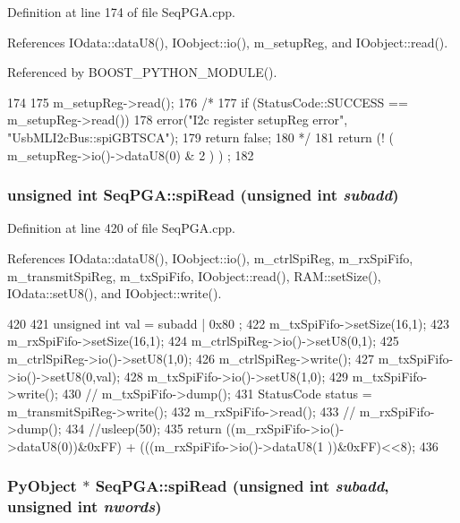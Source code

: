 Definition at line 174 of file SeqPGA.cpp.

References IOdata::dataU8(), IOobject::io(), m\_\-setupReg, and IOobject::read().

Referenced by BOOST\_\-PYTHON\_\-MODULE().


\begin{DoxyCode}
174                        {
175   m_setupReg->read();
176   /*
177     if (StatusCode::SUCCESS == m_setupReg->read()) {
178     error("I2c register setupReg error", "UsbMLI2cBus::spiGBTSCA");
179     return false;
180     }*/
181   return (! ( m_setupReg->io()->dataU8(0) & 2 ) ) ;
182 }
\end{DoxyCode}
\hypertarget{classSeqPGA_a654a40dc597227e59458631f49ff598f}{
\subsubsection[{spiRead}]{\setlength{\rightskip}{0pt plus 5cm}unsigned int SeqPGA::spiRead (unsigned int {\em subadd})}}
\label{classSeqPGA_a654a40dc597227e59458631f49ff598f}


Definition at line 420 of file SeqPGA.cpp.

References IOdata::dataU8(), IOobject::io(), m\_\-ctrlSpiReg, m\_\-rxSpiFifo, m\_\-transmitSpiReg, m\_\-txSpiFifo, IOobject::read(), RAM::setSize(), IOdata::setU8(), and IOobject::write().


\begin{DoxyCode}
420                                                 {
421   unsigned int val = subadd | 0x80 ; 
422   m_txSpiFifo->setSize(16,1);
423   m_rxSpiFifo->setSize(16,1);
424   m_ctrlSpiReg->io()->setU8(0,1);
425   m_ctrlSpiReg->io()->setU8(1,0);
426   m_ctrlSpiReg->write();
427   m_txSpiFifo->io()->setU8(0,val);
428   m_txSpiFifo->io()->setU8(1,0);
429   m_txSpiFifo->write();
430   //  m_txSpiFifo->dump();
431   StatusCode status = m_transmitSpiReg->write();  
432   m_rxSpiFifo->read();
433   //  m_rxSpiFifo->dump();
434   //usleep(50);
435   return   ((m_rxSpiFifo->io()->dataU8(0))&0xFF) + (((m_rxSpiFifo->io()->dataU8(1
      ))&0xFF)<<8);
436 } 
\end{DoxyCode}
\hypertarget{classSeqPGA_a61df84df1bd134d1bda2133d82bafb2e}{
\subsubsection[{spiRead}]{\setlength{\rightskip}{0pt plus 5cm}PyObject $\ast$ SeqPGA::spiRead (unsigned int {\em subadd}, \/  unsigned int {\em nwords})}}
\label{classSeqPGA_a61df84df1bd134d1bda2133d82bafb2e}


